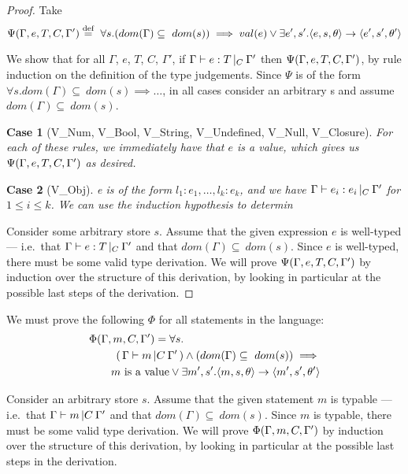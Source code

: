 \documentclass[a4paper]{article}
\theoremstyle{dotless}
\theoremstyle{case}
\newtheorem*{case}{Case}
\theoremstyle{subcase}
\begin{document}
	\begin{proof} Take $$ \Psi(\Gamma, e, T, C, \Gamma') \stackrel{\text{def}}{=} \
		\forall s.  (dom(\Gamma) \subseteq\ dom(s)) \implies val(e) \vee
		\exists e', s'. \langle{}e,s,\theta\rangle{}\rightarrow{}\langle{}e',s',\theta'\rangle $$
	
	  We show that for all $\Gamma$, $e$, $T$, $C$, $\Gamma'$, if
	  $\Gamma{}\vdash e: T\,|_C\:\Gamma'$ then $\Psi(\Gamma, e, T, C, \Gamma')$, by rule induction on the definition of
	  the type judgements. Since $\Psi$ is of the form $\forall s.dom(\Gamma) \subseteq\ dom(s)\implies \dots$, in all cases consider an arbitrary s
	  and assume $dom(\Gamma) \subseteq\ dom(s)$.
	
	  \begin{case}[V\_Num, V\_Bool, V\_String, V\_Undefined, V\_Null, V\_Closure] \quad
		
		For each of these rules, we immediately have that $e$ is a value, which
		gives us $\Psi(\Gamma, e, T, C, \Gamma'){}$ as desired.
	  	
	  \end{case}

	  \begin{case}[V\_Obj]
		e is of the form ${l_1: e_1, \dots, l_k: e_k}$, and we have $\Gamma{}\vdash e_i: e_i\,|_C\:\Gamma'$ for $1 \leq i \leq k$.
		We can use the induction hypothesis to determin
	  \end{case}
	  
	Consider some arbitrary store $s$. Assume that the given expression $e$ is
	well-typed --- i.e.\ that $\Gamma{}\vdash e: T\,|_C\:\Gamma'$ and that $dom(\Gamma) \subseteq\
	dom(s)$.  Since $e$ is well-typed, there must be some valid type
	derivation.  We will prove $\Psi(\Gamma, e, T, C, \Gamma')$ by induction over the structure of
	this derivation, by looking in particular at the possible last steps of the
	derivation.

	\vspace{2ex}
	
  \end{proof}
	We must prove the following $\Phi$ for all statements in the language:
	\begin{eqnarray*}
	\lefteqn{ \indHyp =  \forall s.} \\
		& & (\,\typable{m}\,) \wedge
				(dom(\Gamma) \subseteq\ dom(s))
			\implies \\
		& & \quad \textrm{$m$ is a value} \vee
		\exists m', s'. \transition{m}{s}{\theta}{m'}{s'}{\theta'} \\
	\end{eqnarray*}

	Consider an arbitrary store $s$. Assume that the given statement $m$ is
	typable --- i.e.\ that $\Gamma{}\vdash m\, |C \:\Gamma '$ and that $dom(\Gamma) \subseteq\ dom(s)$.
	Since $m$ is typable, there must be some valid type derivation.
	We will prove $\Phi(\Gamma, m, C, \Gamma')$ by induction over the structure of this derivation,
	by looking in particular at the possible last steps in the derivation.
	
\end{document}
